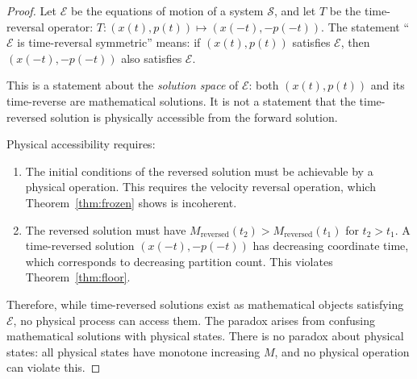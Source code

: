 \begin{proof}
Let $\mathcal{E}$ be the equations of motion of a system $\mathcal{S}$, and let
$T$ be the time-reversal operator: $T: (x(t), p(t)) \mapsto (x(-t), -p(-t))$.
The statement ``$\mathcal{E}$ is time-reversal symmetric'' means: if
$(x(t), p(t))$ satisfies $\mathcal{E}$, then $(x(-t), -p(-t))$ also satisfies
$\mathcal{E}$.

This is a statement about the \emph{solution space} of $\mathcal{E}$: both
$(x(t), p(t))$ and its time-reverse are mathematical solutions. It is not a
statement that the time-reversed solution is physically accessible from the
forward solution.

Physical accessibility requires:
\begin{enumerate}
    \item The initial conditions of the reversed solution must be achievable by
          a physical operation. This requires the velocity reversal operation,
          which Theorem~\ref{thm:frozen} shows is incoherent.
    \item The reversed solution must have $M_{\mathrm{reversed}}(t_2) >
          M_{\mathrm{reversed}}(t_1)$ for $t_2 > t_1$. A time-reversed solution
          $(x(-t), -p(-t))$ has decreasing coordinate time, which corresponds
          to decreasing partition count. This violates Theorem~\ref{thm:floor}.
\end{enumerate}
Therefore, while time-reversed solutions exist as mathematical objects
satisfying $\mathcal{E}$, no physical process can access them. The paradox
arises from confusing mathematical solutions with physical states. There is no
paradox about physical states: all physical states have monotone increasing $M$,
and no physical operation can violate this.
\end{proof}
